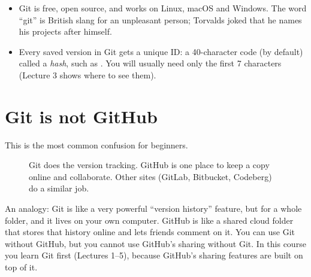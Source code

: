 \begin{quickfact}
\begin{itemize}
  \item Git is free, open source, and works on Linux, macOS and Windows. The word ``git'' is British slang for an unpleasant person; Torvalds joked that he names his projects after himself.
  \item Every saved version in Git gets a unique ID: a 40-character code (by default) called a \emph{hash}, such as . You will usually need only the first 7 characters (Lecture 3 shows where to see them).
\end{itemize}
\end{quickfact}

\section{Git is not GitHub}

This is the most common confusion for beginners.

\begin{figure}[H]
\centering
{}
\caption{Git does the version tracking. GitHub is one place to keep a copy online and collaborate. Other sites (GitLab, Bitbucket, Codeberg) do a similar job.}
\end{figure}

An analogy: Git is like a very powerful ``version history'' feature, but for a whole folder, and it lives on your own computer. GitHub is like a shared cloud folder that stores that history online and lets friends comment on it. You can use Git without GitHub, but you cannot use GitHub's sharing without Git. In this course you learn Git first (Lectures 1--5), because GitHub's sharing features are built on top of it.

